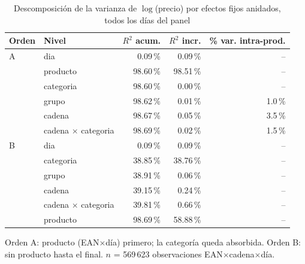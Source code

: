 \begin{table}[htbp]
\caption{Descomposici\'on de la varianza de $\log$(precio) por efectos fijos anidados, todos los d\'ias del panel}
\label{tab:varianza}
\centering\scriptsize\setlength{\tabcolsep}{3pt}
\begin{tabular}{@{}llrrr@{}}
\toprule
Orden & Nivel & $R^2$ acum. & $R^2$ incr. & \% var. intra-prod. \\
\midrule
A & dia & 0.09\,\% & 0.09\,\% & -- \\
 & producto & 98.60\,\% & 98.51\,\% & -- \\
 & categoria & 98.60\,\% & 0.00\,\% & -- \\
 & grupo & 98.62\,\% & 0.01\,\% & 1.0\,\% \\
 & cadena & 98.67\,\% & 0.05\,\% & 3.5\,\% \\
 & cadena $\times$ categoria & 98.69\,\% & 0.02\,\% & 1.5\,\% \\
\midrule
B & dia & 0.09\,\% & 0.09\,\% & -- \\
 & categoria & 38.85\,\% & 38.76\,\% & -- \\
 & grupo & 38.91\,\% & 0.06\,\% & -- \\
 & cadena & 39.15\,\% & 0.24\,\% & -- \\
 & cadena $\times$ categoria & 39.81\,\% & 0.66\,\% & -- \\
 & producto & 98.69\,\% & 58.88\,\% & -- \\
\bottomrule\end{tabular}
\par\smallskip\raggedright\scriptsize Orden A: producto (EAN$\times$d\'ia) primero; la categor\'ia queda absorbida. Orden B: sin producto hasta el final. $n$ = 569\,623 observaciones EAN$\times$cadena$\times$d\'ia.
\end{table}
